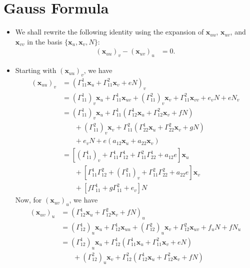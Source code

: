 \documentclass[10pt]{article}
\newcommand{\ve}[1]{\mathbf{#1}}
\begin{document}
  \section{Gauss Formula}
  \begin{itemize}
    \item We shall rewrite the following identity using the expansion of $\ve{x}_{uu}$, $\ve{x}_{uv}$, and $\ve{x}_{vv}$ in the basis $\{ \ve{x}_u, \ve{x}_v, N \}$:
    \begin{align*}
      (\ve{x}_{uu})_v - (\ve{x}_{uv})_u &= 0.
    \end{align*}

    \item Starting with $(\ve{x}_{uu})_v$, we have
    \begin{align*}
      (\ve{x}_{uu})_v 
      &= (\Gamma_{11}^1 \ve{x}_u + \Gamma_{11}^2 \ve{x}_v + e N)_v\\
      &= (\Gamma_{11}^1)_v \ve{x}_u + \Gamma_{11}^1 \ve{x}_{uv} + (\Gamma_{11}^2)_v \ve{x}_v + \Gamma_{11}^2 \ve{x}_{vv} + e_v N + e N_v\\
      &= (\Gamma_{11}^1)_v \ve{x}_u + \Gamma_{11}^1 (\Gamma_{12}^1 \ve{x}_u + \Gamma_{12}^2 \ve{x}_v + f N)\\
      &\phantom{\ =\ } + (\Gamma_{11}^2)_v \ve{x}_v + \Gamma_{11}^2 (\Gamma_{22}^1 \ve{x}_u + \Gamma_{22}^2 \ve{x}_v + g N)\\
      &\phantom{\ =\ }+ e_v N + e (a_{12} \ve{x}_u + a_{22} \ve{x}_v)\\
      &= [(\Gamma_{11}^1)_v + \Gamma_{11}^1 \Gamma_{12}^1 + \Gamma_{11}^2 \Gamma_{22}^1 + a_{12} e] \ve{x}_u\\
      &\phantom{\ =\ } + [\Gamma_{11}^1 \Gamma_{12}^2 + (\Gamma_{11}^2)_v + \Gamma_{11}^2 \Gamma_{22}^2 + a_{22} e] \ve{x}_v\\
      &\phantom{\ =\ } + [f \Gamma_{11}^1 + g\Gamma_{11}^2 + e_v]N 
    \end{align*}
    Now, for $(\ve{x}_{uv})_u$, we have
    \begin{align*}
      (\ve{x}_{uv})_u
      &= (\Gamma_{12}^1 \ve{x}_u + \Gamma_{12}^2 \ve{x}_v + f N)_u\\
      &= (\Gamma_{12}^1)_u \ve{x}_u + \Gamma_{12}^1 \ve{x}_{uu} + (\Gamma_{12}^2)_u \ve{x}_v + \Gamma_{12}^2 \ve{x}_{uv} + f_u N + f N_u\\      
      &= (\Gamma_{12}^1)_u \ve{x}_u + \Gamma_{12}^1 (\Gamma_{11}^1 \ve{x}_u + \Gamma_{11}^2 \ve{x}_v + e N)\\
      &\phantom{\ =\ } + (\Gamma_{12}^2)_u \ve{x}_v + \Gamma_{12}^2 (\Gamma_{12}^1 \ve{x}_u + \Gamma_{12}^2 \ve{x}_v + f N)\\

\end{align*}
\end{itemize}
\end{document}
